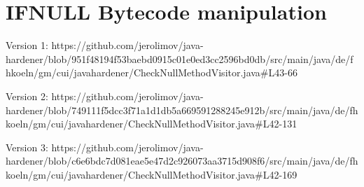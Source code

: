 \section{IFNULL Bytecode manipulation}

Version 1: https://github.com/jerolimov/java-hardener/blob/951f48194f53baebd0915c01e0ed3cc2596bd0db/src/main/java/de/fhkoeln/gm/cui/javahardener/CheckNullMethodVisitor.java\#L43-66

Version 2: https://github.com/jerolimov/java-hardener/blob/749111f5dcc3f71a1d1db5a669591288245e912b/src/main/java/de/fhkoeln/gm/cui/javahardener/CheckNullMethodVisitor.java\#L42-131

Version 3: https://github.com/jerolimov/java-hardener/blob/c6e6bdc7d081eae5e47d2c926073aa3715d908f6/src/main/java/de/fhkoeln/gm/cui/javahardener/CheckNullMethodVisitor.java\#L42-169







